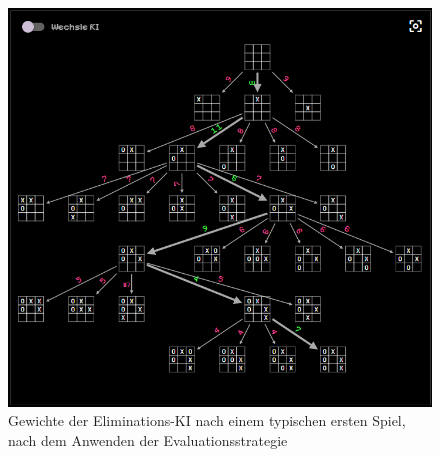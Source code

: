 \documentclass[titlepage]{scrartcl}
\begin{document}
\begin{figure}[htb]
\includegraphics[width = \linewidth]{rückführungPost.png}
\caption{Gewichte der Eliminations-KI nach einem typischen ersten Spiel, nach dem Anwenden der Evaluationsstrategie}
\label{rückführungPost}
\end{figure}
\end{document}
